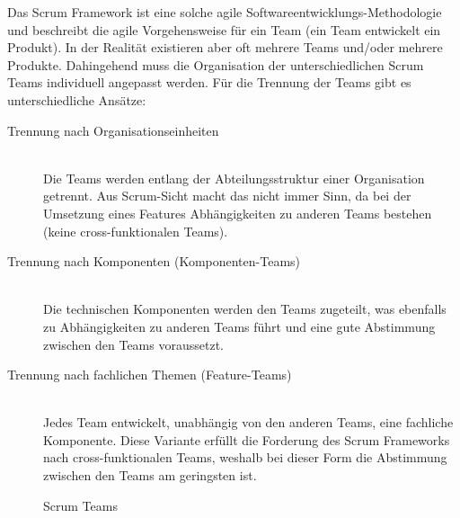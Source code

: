 Das Scrum Framework ist eine solche agile Softwareentwicklungs-Methodologie und beschreibt die agile Vorgehensweise für ein Team (ein Team entwickelt ein Produkt).
In der Realität existieren aber oft mehrere Teams und/oder mehrere Produkte. 
Dahingehend muss die Organisation der unterschiedlichen Scrum Teams individuell angepasst werden.
Für die Trennung der Teams gibt es unterschiedliche Ansätze:
\begin{description}
  \item[Trennung nach Organisationseinheiten] \hfill \\ Die Teams werden entlang der Abteilungsstruktur einer Organisation getrennt. Aus Scrum-Sicht macht das nicht immer Sinn, da bei der Umsetzung eines Features Abhängigkeiten zu anderen Teams bestehen (keine cross-funktionalen Teams).
  \item[Trennung nach Komponenten (Komponenten-Teams)] \hfill \\ Die technischen Komponenten werden den Teams zugeteilt, was ebenfalls zu Abhängigkeiten zu anderen Teams führt und eine gute Abstimmung zwischen den Teams voraussetzt.
  \item[Trennung nach fachlichen Themen (Feature-Teams)] \hfill \\ Jedes Team entwickelt, unabhängig von den anderen Teams, eine fachliche Komponente. Diese Variante erfüllt die Forderung des Scrum Frameworks nach cross-funktionalen Teams, weshalb bei dieser Form die Abstimmung zwischen den Teams am geringsten ist.
\end{description}

\begin{savenotes}
  \begin{figure}[H]
    \centering
  \caption{Scrum Teams}\label{fig:Scrum Teams}
  \end{figure}
\end{savenotes}

